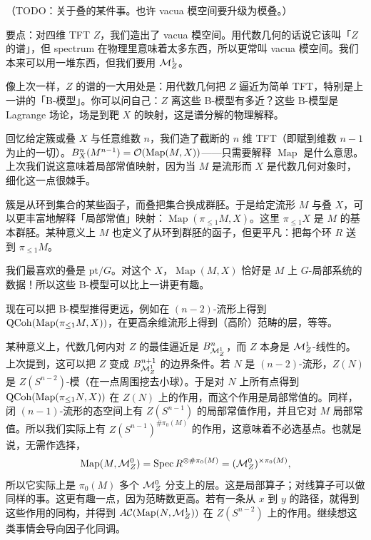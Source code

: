 （TODO：关于叠的某件事。也许 vacua 模空间要升级为模叠。）

要点：对四维 TFT $Z$，我们造出了 vacua 模空间。用代数几何的话说它该叫「$Z$ 的谱」，但 spectrum 在物理里意味着太多东西，所以更常叫 vacua 模空间。我们本来可以用一堆东西，但我们要用 $\mathcal{M}^1_Z$。

像上次一样，$Z$ 的谱的一大用处是：用代数几何把 $Z$ 逼近为简单 TFT，特别是上一讲的「B-模型」。你可以问自己：$Z$ 离这些 B-模型有多近？这些 B-模型是 Lagrange 场论，场是到靶 $X$ 的映射，这是谱分解的物理解释。

回忆给定簇或叠 $X$ 与任意维数 $n$，我们造了截断的 $n$ 维 TFT（即赋到维数 $n-1$ 为止的一切）。$B^n_X(M^{n-1})=\mathcal{O}(\operatorname{Map}(M,X))$——只需要解释 $\operatorname{Map}$ 是什么意思。上次我们说这意味着局部常值映射，因为当 $M$ 是流形而 $X$ 是代数几何对象时，细化这一点很棘手。

簇是从环到集合的某些函子，而叠把集合换成群胚。于是给定流形 $M$ 与叠 $X$，可以更丰富地解释「局部常值」映射：$\operatorname{Map}(\pi_{\le1}M,X)$。这里 $\pi_{\le1}X$ 是 $M$ 的基本群胚。某种意义上 $M$ 也定义了从环到群胚的函子，但更平凡：把每个环 $R$ 送到 $\pi_{\le1}M$。

我们最喜欢的叠是 $\mathrm{pt}/G$。对这个 $X$，$\operatorname{Map}(M,X)$ 恰好是 $M$ 上 $G$-局部系统的数据！所以这些 B-模型可以比上一讲更有趣。

现在可以把 B-模型推得更远，例如在 $(n-2)$-流形上得到 $\mathrm{QCoh}(\operatorname{Map}(\pi_{\le1}M,X))$，在更高余维流形上得到（高阶）范畴的层，等等。

某种意义上，代数几何内对 $Z$ 的最佳逼近是 $B^n_{\mathcal{M}^1_Z}$，而 $Z$ 本身是 $\mathcal{M}^1_Z$-线性的。上次提到，这可以把 $Z$ 变成 $B^{n+1}_{\mathcal{M}^1_Z}$ 的边界条件。若 $N$ 是 $(n-2)$-流形，$Z(N)$ 是 $Z(S^{n-2})$-模（在一点周围挖去小球）。于是对 $N$ 上所有点得到 $\mathrm{QCoh}(\operatorname{Map}(\pi_{\le1}N,X))$ 在 $Z(N)$ 上的作用，而这个作用是局部常值的。同样，闭 $(n-1)$-流形的态空间上有 $Z(S^{n-1})$ 的局部常值作用，并且它对 $M$ 局部常值。所以我们实际上有 $Z(S^{n-1})^{\#\pi_0(M)}$ 的作用，这意味着不必选基点。也就是说，无需作选择，
\[
\operatorname{Map}(M,\mathcal{M}^0_Z)=\operatorname{Spec} R^{\otimes\#\pi_0(M)}=(\mathcal{M}^0_Z)^{\times\pi_0(M)},
\]
所以它实际上是 $\pi_0(M)$ 多个 $\mathcal{M}^0_Z$ 分支上的层。这是局部算子；对线算子可以做同样的事。这更有趣一点，因为范畴数更高。若有一条从 $x$ 到 $y$ 的路径，就得到这些作用的同构，并得到 $A\mathcal{C}(\operatorname{Map}(N,\mathcal{M}^1_Z))$ 在 $Z(S^{n-2})$ 上的作用。继续想这类事情会导向因子化同调。

